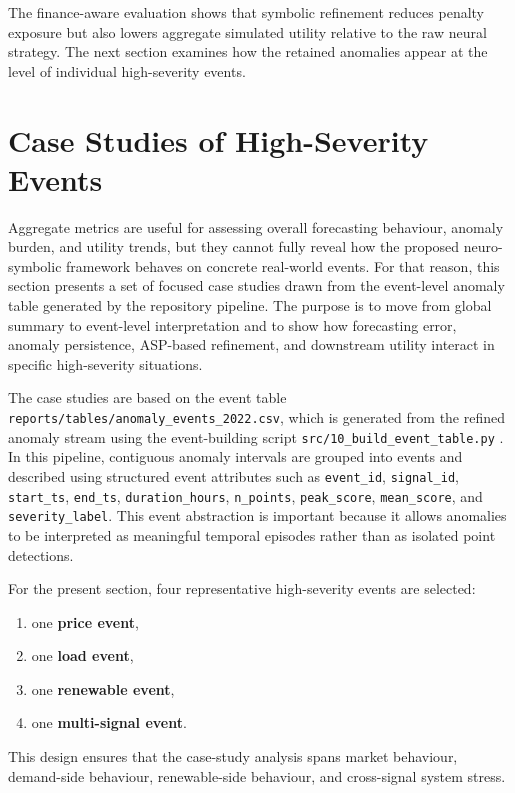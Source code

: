 The finance-aware evaluation shows that symbolic refinement reduces penalty
exposure but also lowers aggregate simulated utility relative to the raw neural
strategy. The next section examines how the retained anomalies appear at the level
of individual high-severity events.

\section{Case Studies of High-Severity Events}
\label{sec:case_studies_high_severity_events}

Aggregate metrics are useful for assessing overall forecasting behaviour, anomaly burden, and utility trends, but they cannot fully reveal how the proposed neuro-symbolic framework behaves on concrete real-world events. For that reason, this section presents a set of focused case studies drawn from the event-level anomaly table generated by the repository pipeline. The purpose is to move from global summary to event-level interpretation and to show how forecasting error, anomaly persistence, ASP-based refinement, and downstream utility interact in specific high-severity situations.

The case studies are based on the event table \texttt{reports/tables/anomaly\_events\_2022.csv}, which is generated from the refined anomaly stream using the event-building script \texttt{src/10\_build\_event\_table.py} \cite{repo_thesis_grid_anomaly}. In this pipeline, contiguous anomaly intervals are grouped into events and described using structured event attributes such as \texttt{event\_id}, \texttt{signal\_id}, \texttt{start\_ts}, \texttt{end\_ts}, \texttt{duration\_hours}, \texttt{n\_points}, \texttt{peak\_score}, \texttt{mean\_score}, and \texttt{severity\_label}. This event abstraction is important because it allows anomalies to be interpreted as meaningful temporal episodes rather than as isolated point detections.

For the present section, four representative high-severity events are selected:
\begin{enumerate}
	\item one \textbf{price event},
	\item one \textbf{load event},
	\item one \textbf{renewable event},
	\item one \textbf{multi-signal event}.
\end{enumerate}
This design ensures that the case-study analysis spans market behaviour, demand-side behaviour, renewable-side behaviour, and cross-signal system stress.

